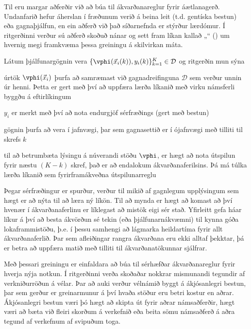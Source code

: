 Til eru margar aðferðir við að búa til ákvarðanareglur fyrir áætlanagerð. 
Undanfarið hefur áherslan í fræðunum verið á beina leit (t.d. gentíska bestun) 
eða gagnaþjálfun, en ein aðferð við það síðarnefnda er stýrður lærdómur.
Í ritgerðinni verður sú aðferð skoðuð nánar og sett fram líkan kallað 
„\fullnameAlice“ (\Alice) um hvernig megi 
framkvæma þessa greiningu á skilvirkan máta. 

Látum þjálfunargögnin vera 
\mbox{$\{\vphi(\vec{x}_i(k)),y_i(k)\}_{k=1}^K\in\mathcal{D}$} og ritgerðin mun 
sýna
\begin{enumerate*}[itemjoin*={{; einnig }}]
    \item úrtök $\vphi(\vec{x}_i)$ þurfa að samræmast við gagnadreifinguna 
    $\mathcal{D}$ sem verður unnin úr henni. Þetta er gert með því að uppfæra 
    lærða líkanið með virku námsferli byggðu á eftirlíkingum
    \item $y_i$ er merkt með því að nota endurgjöf sérfræðings (gert með bestun)
    \item gögnin þurfa að vera í jafnvægi, þar sem gagnasettið er í ójafnvægi 
    með tilliti til skrefs $k$
    \item til að betrumbæta lýsingu á núverandi stöðu $\vphi$, er hægt að 
    nota útspilun fyrir næstu 
    $(K-k)$ skref, það er að endalokum ákvarðanaferilsins. Þá má túlka 
    lærða líkanið sem fyrirframákveðna útspilunarreglu
\end{enumerate*}

Þegar sérfræðingur er spurður, verður til mikið af gagnlegum upplýsingum sem 
hægt er að nýta til að læra ný líkön. Til að mynda er hægt að komast að því 
hvenær í ákvarðana\-ferlinu er líklegast að mistök eigi sér stað. Yfirleitt 
gefa háar líkur á því að besta ákvörðun sé tekin (eða þjálfunarnákvæmni) til 
kynna góða lokaframmistöðu, þ.e. í þessu samhengi að lágmarka heildartíma fyrir 
allt ákvarðanaferlið. 
Þar sem afleiðingar rangra ákvarðana eru ekki alltaf þekktar, 
þá er betra að uppfæra matið með tilliti til ákvarðanatökunnar sjálfrar.

Með þessari greiningu er einfaldara að búa til sérhæfðar ákvarðanareglur fyrir 
hverja nýja notkun. Í ritgerðinni verða skoðaðar nokkrar mismunandi tegundir af 
verkniðurröðun á vélar. 
Þar að auki verður vélnámið byggt á ákjósanlegri bestun, þar sem gerður er 
greinar\-munur á því hvaða stöður eru betri kostur en aðrar. Ákjósanlegri 
bestun væri þó hægt að skipta út fyrir aðrar námsaðferðir, hægt væri að bæta 
við fleiri skorðum á verkefnið eða beita sömu námsaðferð á aðra tegund af 
verkefnum af svipuðum toga. 

